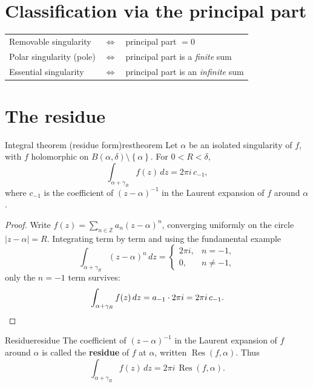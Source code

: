 \documentclass[11pt,openany]{report}
\newcommand{\Z}{\mathbb{Z}}
\newcommand{\Res}{\operatorname{Res}}
\newcommand{\abs}[1]{\left\lvert #1 \right\rvert}
\newcommand{\set}[1]{\left\{ #1 \right\}}
\begin{document}
\section{Classification via the principal part}

\begin{keybox}
\centering
\begin{tabular}{lcl}
Removable singularity & $\Longleftrightarrow$ & principal part $=0$ \\[3pt]
Polar singularity (pole) & $\Longleftrightarrow$ & principal part is a \emph{finite} sum \\[3pt]
Essential singularity & $\Longleftrightarrow$ & principal part is an \emph{infinite} sum
\end{tabular}
\end{keybox}

\section{The residue}

\begin{theorem}{Integral theorem (residue form)}{restheorem}
Let $\alpha$ be an isolated singularity of $f$, with $f$ holomorphic on
$B(\alpha,\delta)\setminus\set\alpha$. For $0<R<\delta$,
\[
  \int_{\alpha+\gamma_R} f(z)\,dz = 2\pi i\, c_{-1},
\]
where $c_{-1}$ is the coefficient of $(z-\alpha)^{-1}$ in the Laurent expansion of $f$
around $\alpha$.
\end{theorem}

\begin{proof}
Write $f(z)=\sum_{n\in\Z} a_n(z-\alpha)^n$, converging uniformly on the circle
$\abs{z-\alpha}=R$. Integrating term by term and using the fundamental example
\[
  \int_{\alpha+\gamma_R}(z-\alpha)^n\,dz =
  \begin{cases}
    2\pi i, & n=-1,\\
    0, & n\ne-1,
  \end{cases}
\]
only the $n=-1$ term survives:
\[
  \int_{\alpha+\gamma_R} f(z)\,dz = a_{-1}\cdot 2\pi i = 2\pi i\, c_{-1}. \qedhere
\]
\end{proof}

\begin{definition}{Residue}{residue}
The coefficient of $(z-\alpha)^{-1}$ in the Laurent expansion of $f$ around $\alpha$ is
called the \textbf{residue} of $f$ at $\alpha$, written $\Res(f,\alpha)$. Thus
\[
  \boxed{\ \int_{\alpha+\gamma_R} f(z)\,dz = 2\pi i\,\Res(f,\alpha).\ }
\]
\end{definition}
\end{document}
